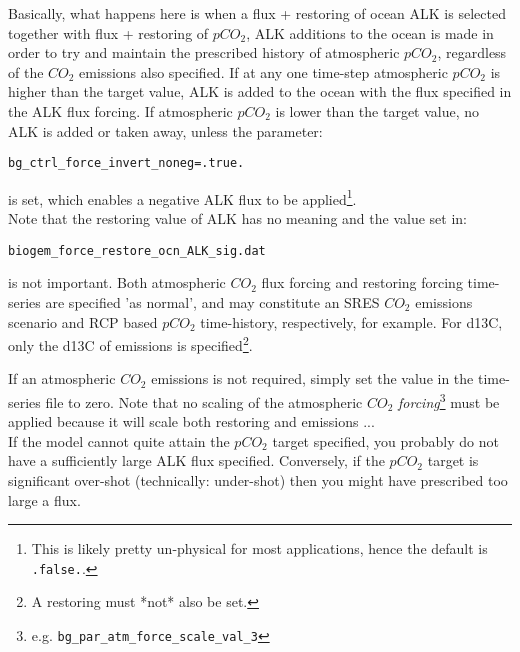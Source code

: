 \documentclass[11pt,fleqn]{book} %
\begin{document}
\begin{enumerate}[noitemsep]
\vspace{1mm}
Basically, what happens here is when a flux + restoring of ocean ALK is selected together with flux + restoring of \(pCO_{2}\), ALK additions to the ocean is made in order to try and maintain the prescribed history of atmospheric \(pCO_{2}\), regardless of the \(CO_{2}\) emissions also specified. If at any one time-step atmospheric \(pCO_{2}\) is higher than the target value, ALK is added to the ocean with the flux specified in the ALK flux forcing. If atmospheric \(pCO_{2}\) is lower than the target value, no ALK is added or taken away, unless the parameter:
\vspace{-1mm}\small\begin{verbatim}
bg_ctrl_force_invert_noneg=.true.
\end{verbatim}\normalsize\vspace{-1mm}
is set, which enables a negative ALK flux to be applied\footnote{This is likely pretty un-physical for most applications, hence the default is \texttt{.false.}.}.
\\ Note that the restoring value of ALK has no meaning and the value set in:
\vspace{-1mm}\small\begin{verbatim}
biogem_force_restore_ocn_ALK_sig.dat
\end{verbatim}\normalsize\vspace{-1mm}
is not important.
Both atmospheric \(CO_{2}\) flux forcing and restoring forcing time-series are specified 'as normal', and may constitute an SRES \(CO_{2}\) emissions scenario and RCP based \(pCO_{2}\) time-history, respectively, for example. For d13C, only the d13C of emissions is specified\footnote{A restoring must *not* also be set.}.

If an atmospheric \(CO_{2}\) emissions is not required, simply set the value in the time-series file to zero.
Note that no scaling of the atmospheric \(CO_{2}\) \textit{forcing}\footnote{e.g. \texttt{bg\_par\_atm\_force\_scale\_val\_3}}
must be applied because it will scale both restoring and emissions ...
\\ If the model cannot quite attain the \(pCO_{2}\) target specified, you probably do not have a sufficiently large ALK flux specified. Conversely, if the \(pCO_{2}\) target is significant over-shot (technically: under-shot) then you might have prescribed too large a flux.

\end{enumerate}

%
\end{document}
